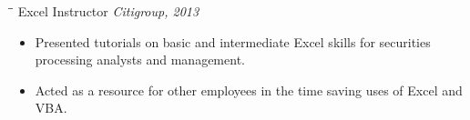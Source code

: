 \documentclass{res}
\begin{document}
\begin{resume}
 
 \begin{tabbing}
   \hspace{2.3in}\= \hspace{1.6in}\= \kill %
    Excel Instructor  \hspace{308 pt}  \textit{Citigroup, 2013} 
   \end{tabbing}
  \vspace{-10 pt}     %
\begin{itemize}
\item Presented tutorials on basic and intermediate Excel skills for securities processing analysts and management.
\item Acted as a resource for other employees in the time saving uses of Excel and VBA. 
\end{itemize}
\vspace{-15 pt}

\end{resume}
\end{document}
